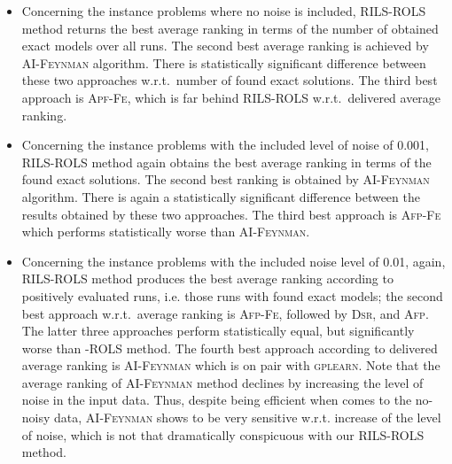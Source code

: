 \documentclass[a4paper,12pt]{elsarticle}
\begin{document}
\begin{itemize}
	\item  Concerning the instance problems where no noise is included, \textsc{RILS}-\textsc{ROLS} method returns the best average ranking in terms of the number of obtained exact models over all runs.  The second best average ranking is achieved by \textsc{AI-Feynman} algorithm. There is  statistically significant difference between these two approaches w.r.t.\ number of found exact solutions. The third best approach is \textsc{Apf-Fe},  which is far behind \textsc{RILS}-\textsc{ROLS} w.r.t.\ delivered average ranking.  
	\item    Concerning the instance problems with the included  level of noise of 0.001, \textsc{RILS}-\textsc{ROLS} method again obtains the best average ranking in terms of the found exact solutions.   The second best ranking is obtained by \textsc{AI-Feynman} algorithm. There is again a statistically significant difference between the results obtained by these two approaches. The third best approach is \textsc{Afp-Fe} which performs statistically worse than \textsc{AI-Feynman}.  
	\item  Concerning the instance problems with the included noise level of  0.01, again, \textsc{RILS-ROLS} method produces the best average ranking according to positively evaluated runs, i.e. those runs with found  exact models; the second best approach w.r.t.\ average ranking is \textsc{Afp-Fe}, followed by \textsc{Dsr}, and \textsc{Afp}. The  latter three approaches perform statistically equal, but significantly worse than -\textsc{ROLS} method. 	The fourth best approach according to delivered average ranking is \textsc{AI-Feynman} which is on pair with \textsc{gplearn}. Note that the average ranking of \textsc{AI-Feynman} method declines by increasing  the level of noise in the input data. Thus, despite being efficient when comes to the no-noisy data,  \textsc{AI-Feynman} shows to be very sensitive w.r.t.  increase of the level of noise, which is not that dramatically conspicuous with our \textsc{RILS}-\textsc{ROLS} method.   
	
\end{itemize}
\end{document}
